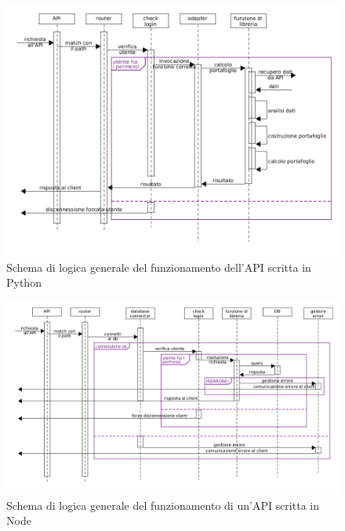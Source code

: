 \newpage
\begin{figure}[!ht]
    \centering
    \includegraphics[scale=0.6, angle=270]{pictures/schema_generale_api_python.png}
    \caption{Schema di logica generale del funzionamento dell'API scritta in Python}
    \label{DSD dell'API Python}
\end{figure}

\begin{figure}[!ht]
    \centering
    \includegraphics[scale=0.6, angle=270]{pictures/schema_generale_api_node.png}
    \caption{Schema di logica generale del funzionamento di un'API scritta in Node}
    \label{DSD delle API Node}
\end{figure}
